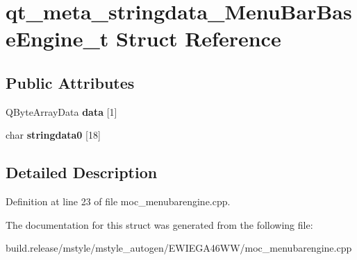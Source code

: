 \hypertarget{structqt__meta__stringdata___menu_bar_base_engine__t}{}\section{qt\+\_\+meta\+\_\+stringdata\+\_\+\+Menu\+Bar\+Base\+Engine\+\_\+t Struct Reference}
\label{structqt__meta__stringdata___menu_bar_base_engine__t}
\subsection*{Public Attributes}
\begin{DoxyCompactItemize}
\item 
\mbox{\label{structqt__meta__stringdata___menu_bar_base_engine__t_a008fb77995da817fdf14af8b1acf081f}} 
Q\+Byte\+Array\+Data {\bfseries data} \mbox{[}1\mbox{]}
\item 
\mbox{\label{structqt__meta__stringdata___menu_bar_base_engine__t_a3365019434fcfd792f7ad6d145bc5132}} 
char {\bfseries stringdata0} \mbox{[}18\mbox{]}
\end{DoxyCompactItemize}


\subsection{Detailed Description}


Definition at line 23 of file moc\+\_\+menubarengine.\+cpp.



The documentation for this struct was generated from the following file\+:\begin{DoxyCompactItemize}
\item 
build.\+release/mstyle/mstyle\+\_\+autogen/\+E\+W\+I\+E\+G\+A46\+W\+W/moc\+\_\+menubarengine.\+cpp\end{DoxyCompactItemize}
